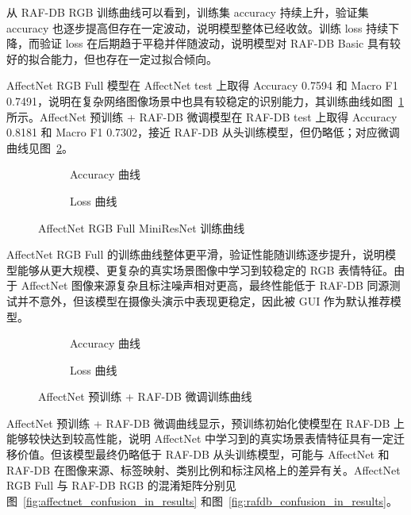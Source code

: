 \documentclass[UTF8,a4paper,12pt]{ctexart}
\newcommand{\figplaceholder}[1]{%
  \begin{center}
    \fbox{\parbox{0.78\textwidth}{\centering #1}}
  \end{center}
}
\begin{document}
从 RAF-DB RGB 训练曲线可以看到，训练集 accuracy 持续上升，验证集 accuracy 也逐步提高但存在一定波动，说明模型整体已经收敛。训练 loss 持续下降，而验证 loss 在后期趋于平稳并伴随波动，说明模型对 RAF-DB Basic 具有较好的拟合能力，但也存在一定过拟合倾向。

AffectNet RGB Full 模型在 AffectNet test 上取得 Accuracy 0.7594 和 Macro F1 0.7491，说明在复杂网络图像场景中也具有较稳定的识别能力，其训练曲线如图~\ref{fig:affectnet_full_curves_in_results} 所示。AffectNet 预训练 + RAF-DB 微调模型在 RAF-DB test 上取得 Accuracy 0.8181 和 Macro F1 0.7302，接近 RAF-DB 从头训练模型，但仍略低；对应微调曲线见图~\ref{fig:affectnet_pretrained_rafdb_curves}。

\begin{figure}[H]
  \centering
  \begin{subfigure}{0.48\textwidth}
    \centering
    \figplaceholder{\rule{0pt}{1.2em}}
    \caption{Accuracy 曲线}
  \end{subfigure}
  \hfill
  \begin{subfigure}{0.48\textwidth}
    \centering
    \figplaceholder{\rule{0pt}{1.2em}}
    \caption{Loss 曲线}
  \end{subfigure}
  \caption{AffectNet RGB Full MiniResNet 训练曲线}
  \label{fig:affectnet_full_curves_in_results}
\end{figure}

AffectNet RGB Full 的训练曲线整体更平滑，验证性能随训练逐步提升，说明模型能够从更大规模、更复杂的真实场景图像中学习到较稳定的 RGB 表情特征。由于 AffectNet 图像来源复杂且标注噪声相对更高，最终性能低于 RAF-DB 同源测试并不意外，但该模型在摄像头演示中表现更稳定，因此被 GUI 作为默认推荐模型。

\begin{figure}[H]
  \centering
  \begin{subfigure}{0.48\textwidth}
    \centering
    \figplaceholder{\rule{0pt}{1.2em}}
    \caption{Accuracy 曲线}
  \end{subfigure}
  \hfill
  \begin{subfigure}{0.48\textwidth}
    \centering
    \figplaceholder{\rule{0pt}{1.2em}}
    \caption{Loss 曲线}
  \end{subfigure}
  \caption{AffectNet 预训练 + RAF-DB 微调训练曲线}
  \label{fig:affectnet_pretrained_rafdb_curves}
\end{figure}

AffectNet 预训练 + RAF-DB 微调曲线显示，预训练初始化使模型在 RAF-DB 上能够较快达到较高性能，说明 AffectNet 中学习到的真实场景表情特征具有一定迁移价值。但该模型最终仍略低于 RAF-DB 从头训练模型，可能与 AffectNet 和 RAF-DB 在图像来源、标签映射、类别比例和标注风格上的差异有关。AffectNet RGB Full 与 RAF-DB RGB 的混淆矩阵分别见图~\ref{fig:affectnet_confusion_in_results} 和图~\ref{fig:rafdb_confusion_in_results}。
\end{document}
